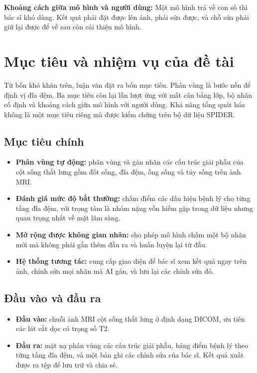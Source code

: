 \textbf{Khoảng cách giữa mô hình và người dùng:} Một mô hình trả về con số thì bác sĩ khó dùng. Kết quả phải đặt được lên ảnh, phải sửa được, và chỗ sửa phải giữ lại được để về sau còn cải thiện mô hình.

\section{Mục tiêu và nhiệm vụ của đề tài}

Từ bốn khó khăn trên, luận văn đặt ra bốn mục tiêu. Phân vùng là bước nền để định vị đĩa đệm. Ba mục tiêu còn lại lần lượt ứng với mất cân bằng lớp, bộ nhãn cố định và khoảng cách giữa mô hình với người dùng. Khả năng tổng quát hóa không là một mục tiêu riêng mà được kiểm chứng trên bộ dữ liệu SPIDER.


\subsection*{Mục tiêu chính}
\begin{itemize}
    \item \textbf{Phân vùng tự động:} phân vùng và gán nhãn các cấu trúc giải phẫu của cột sống thắt lưng gồm đốt sống, đĩa đệm, ống sống và tủy sống trên ảnh MRI.
    \item \textbf{Đánh giá mức độ bất thường:} chấm điểm các dấu hiệu bệnh lý cho từng tầng đĩa đệm, với trọng tâm là nhóm nặng vốn hiếm gặp trong dữ liệu nhưng quan trọng nhất về mặt lâm sàng.
    \item \textbf{Mở rộng được không gian nhãn:} cho phép mô hình chấm một bộ nhãn mới mà không phải gắn thêm đầu ra và huấn luyện lại từ đầu.
    \item \textbf{Hệ thống tương tác:} cung cấp giao diện để bác sĩ xem kết quả ngay trên ảnh, chỉnh sửa mọi nhãn mà AI gán, và lưu lại các chỉnh sửa đó.
\end{itemize}

\subsection*{Đầu vào và đầu ra}
\begin{itemize}
    \item \textbf{Đầu vào:} chuỗi ảnh MRI cột sống thắt lưng ở định dạng DICOM, ưu tiên các lát cắt dọc có trọng số T2.
    \item \textbf{Đầu ra:} mặt nạ phân vùng các cấu trúc giải phẫu, bảng điểm bệnh lý theo từng tầng đĩa đệm, và một bản ghi các chỉnh sửa của bác sĩ. Kết quả xuất được ra tệp để lưu trữ và chia sẻ.
\end{itemize}

